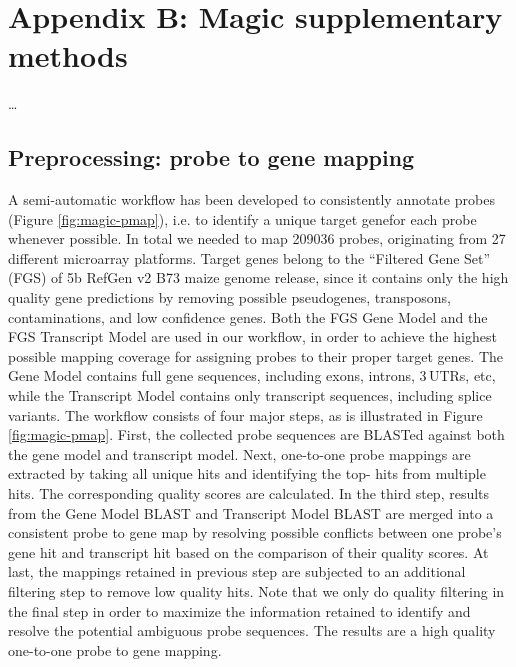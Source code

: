 \chapter{Appendix B: Magic supplementary methods}\label{ch:apd-magic}

\ldots

\instructionsappendices


\section{Preprocessing: probe to gene mapping}

A semi-automatic workflow has been developed to consistently
annotate probes (Figure \ref{fig:magic-pmap}), i.e. to identify a unique target 
genefor each probe whenever possible. In total we needed to map
209036 probes, originating from 27 different microarray
platforms. Target genes belong to the “Filtered Gene Set” (FGS)
of 5b RefGen v2 B73 maize genome release, since it contains only
the high quality gene predictions by removing possible
pseudogenes, transposons, contaminations, and low confidence
genes. Both the FGS Gene Model and the FGS Transcript Model are
used in our workflow, in order to achieve the highest possible
mapping coverage for assigning probes to their proper target
genes. The Gene Model contains full gene sequences, including
exons, introns, 3\textquotesingle\,UTRs, etc, while the Transcript Model 
contains
only transcript sequences, including splice variants. The
workflow consists of four major steps, as is illustrated in
Figure \ref{fig:magic-pmap}. First, the collected probe sequences are BLASTed
against both the gene model and transcript model. Next,
one-to-one probe mappings are extracted by taking all unique hits
and identifying the top- hits from multiple hits. The
corresponding quality scores are calculated. In the third step,
results from the Gene Model BLAST and Transcript Model BLAST are
merged into a consistent probe to gene map by resolving possible
conflicts between one probe’s gene hit and transcript hit based
on the comparison of their quality scores. At last, the mappings
retained in previous step are subjected to an additional
filtering step to remove low quality hits. Note that we only do
quality filtering in the final step in order to maximize the
information retained to identify and resolve the potential
ambiguous probe sequences. The results are a high quality
one-to-one probe to gene mapping.


